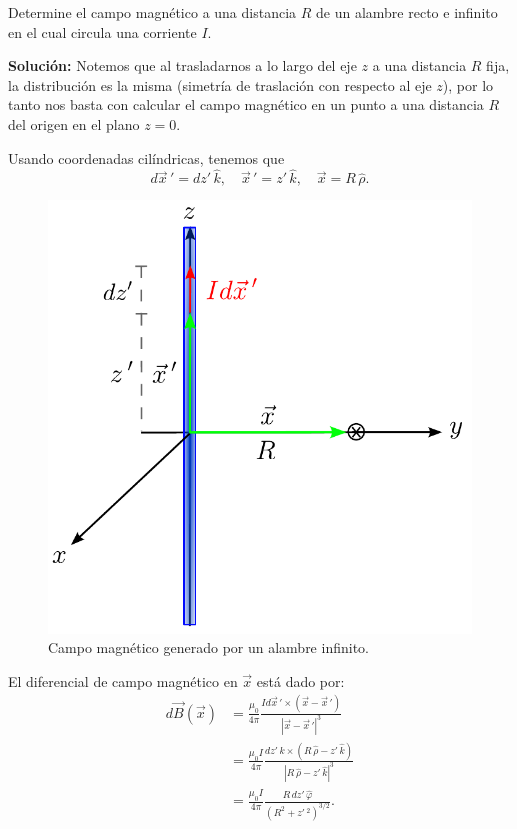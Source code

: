 \begin{ejemplo}
    Determine el campo magnético a una distancia $R$ de un alambre recto e infinito en el cual circula una corriente $I$.

\textbf{Solución:} Notemos que al trasladarnos a lo largo del eje $z$ a una distancia $R$ fija, la distribución es la misma (simetría de traslación con respecto al eje $z$), por lo tanto nos basta con calcular el campo magnético en un punto a una distancia $R$ del origen en el plano $z = 0$. 

Usando coordenadas cilíndricas, tenemos que
$$d\vec{x}\,' = dz' \,\hat{k}, \quad \vec{x}\,'= z' \,\hat{k}, \quad  \vec{x} = R \,\hat{\rho}.$$

\begin{figure}[H]
     \centering
     \includegraphics[scale = 0.65]{Figuras/Ej-1-BiotSavart.pdf}
     \caption{Campo magnético generado por un alambre infinito.}
     \label{fig:Ej-1-Biot-Savart}
 \end{figure}

    El diferencial de campo magnético en $\Vec{x}$ está dado por:
\begin{align*}
    d\vec{B}(\vec{x}) &= \frac{\mu_0}{4\pi}  \frac{I d\vec{x}\,' \times (\vec{x} - \vec{x}\,')}{|\vec{x} - \vec{x}\,'|^3} \\
&=  \frac{\mu_0 I}{4\pi} \frac{dz' \,\hat{k} \times (R \,\hat{\rho} - z'\,\hat{k}) }{|R \,\hat{\rho} - z'\,\hat{k}|^3} \\
&= \frac{\mu_0 I}{4\pi} \frac{R \,dz' \,\hat{\varphi}}{(R^2 + z'\,^2)^{3/2}}.
\end{align*}


\end{ejemplo}
